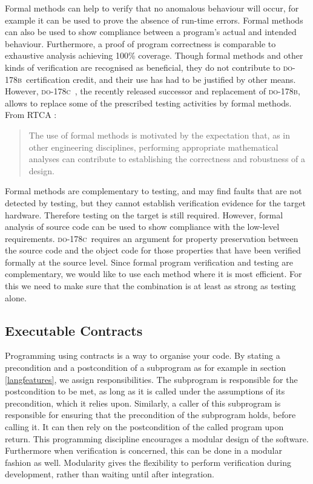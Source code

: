 \documentclass[sttt,final]{svjour}
\newcommand{\DOB}{\textsc{do-178b}}
\newcommand{\DOC}{\textsc{do-178c}}
\begin{document}
Formal methods can help to verify that no anomalous behaviour will
occur, for example it can be used to prove the absence of run-time
errors. Formal methods can also be used to show compliance between a
program's actual and intended behaviour. Furthermore, a proof of
program correctness is comparable to exhaustive analysis achieving
100\% coverage. Though formal methods and other kinds of verification
are recognised as beneficial, they do not contribute to \DOB\
certification credit, and their use has had to be justified by other
means. However, \DOC\ \cite{do178c}, the recently released successor and
replacement of \DOB, allows to replace some of the prescribed testing
activities by formal methods. From RTCA \cite{do178c}:
%
\begin{quote}
  The use of formal methods is motivated by the expectation that, as
  in other engineering disciplines, performing appropriate
  mathematical analyses can contribute to establishing the correctness
  and robustness of a design.
\end{quote}
%
Formal methods are complementary to testing, and may find faults that
are not detected by testing, but they cannot establish verification
evidence for the target hardware. Therefore testing on the target is
still required. However, formal analysis of source code can be used to
show compliance with the low-level requirements. \DOC\ requires an
argument for property preservation between the source code and the
object code for those properties that have been verified formally at
the source level. Since formal program verification and testing are
complementary, we would like to use each method where it is most
efficient. For this we need to make sure that the combination is at
least as strong as testing alone.

\subsection{Executable Contracts}
Programming using contracts is a way to organise your code. By stating
a precondition and a postcondition of a subprogram as for example in
section \ref{langfeatures}, we assign responsibilities. The subprogram
is responsible for the postcondition to be met, as long as it is
called under the assumptions of its precondition, which it relies
upon. Similarly, a caller of this subprogram is responsible for ensuring that
the precondition of the subprogram holds, before calling it. It can
then rely on the postcondition of the called program upon return. This
programming discipline encourages a modular design of the
software. Furthermore when verification is concerned, this can be done
in a modular fashion as well. Modularity gives the flexibility to
perform verification during development, rather than waiting until
after integration.
\end{document}
